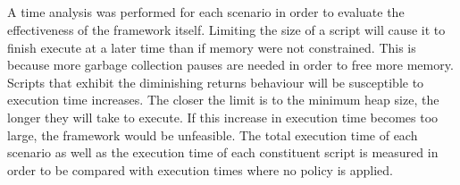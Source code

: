\documentclass{l4proj}
\begin{document}
\\\\
\\\\
\hspace*{3em} A time analysis was performed for each scenario in order to evaluate the effectiveness of the framework itself. Limiting the size of a script will cause it to finish execute at a later time than if memory were not constrained. This is because more garbage collection pauses are needed in order to free more memory. Scripts that exhibit the diminishing returns behaviour will be susceptible to execution time increases. The closer the limit is to the minimum heap size, the longer they will take to execute. If this increase in execution time becomes too large, the framework would be unfeasible. The total execution time of each scenario as well as the execution time of each constituent script is measured in order to be compared with execution times where no policy is applied.
\end{document}
